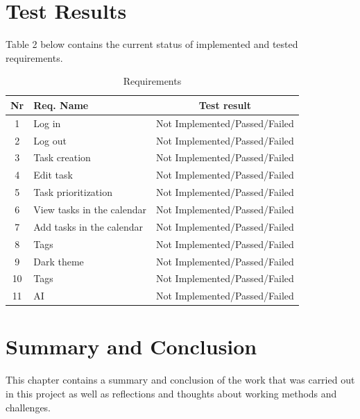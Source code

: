 \documentclass{article}
\begin{document}
\clearpage
\section{Test Results}
Table 2 below contains the current status of implemented and tested requirements.

\begin{table}[H]
  \centering
  \begin{tabularx}{\textwidth}{|c|X|c|}
    \toprule
    \textbf{Nr} & \textbf{Req. Name}         & \textbf{Test result}          \\
    \hline
    1           & Log in                     & Not Implemented/Passed/Failed \\    \hline
    2           & Log out                    & Not Implemented/Passed/Failed \\    \hline
    3           & Task creation              & Not Implemented/Passed/Failed \\ \hline
    4           & Edit task                  & Not Implemented/Passed/Failed \\    \hline
    5           & Task prioritization        & Not Implemented/Passed/Failed \\    \hline
    6           & View tasks in the calendar & Not Implemented/Passed/Failed \\    \hline
    7           & Add tasks in the calendar  & Not Implemented/Passed/Failed \\    \hline
    8           & Tags                       & Not Implemented/Passed/Failed \\ \hline
    9           & Dark theme                 & Not Implemented/Passed/Failed \\    \hline
    10          & Tags                       & Not Implemented/Passed/Failed \\\hline
    11          & AI                         & Not Implemented/Passed/Failed \\

    \bottomrule
  \end{tabularx}
  \caption{Requirements}
  \label{results}
\end{table}

\section{Summary and Conclusion}
This chapter contains a summary and conclusion of the work that was carried out in this project as well as reflections and thoughts about working methods and challenges.
\end{document}
